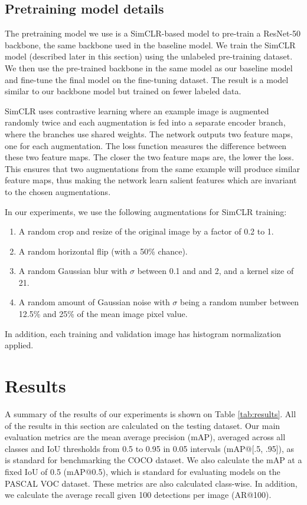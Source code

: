 \documentclass[conference]{IEEEtran}
\begin{document}
\subsection{Pretraining model details}

The pretraining model we use is a SimCLR-based model \cite{chenSimpleFrameworkContrastive2020} to pre-train a ResNet-50 backbone, the same backbone used in the baseline model. We train the SimCLR model (described later in this section) using the unlabeled pre-training dataset. We then use the pre-trained backbone in the same model as our baseline model and fine-tune the final model on the fine-tuning dataset. The result is a model similar to our backbone model but trained on fewer labeled data.

SimCLR uses contrastive learning where an example image is augmented randomly twice and each augmentation is fed into a separate encoder branch, where the branches use shared weights. The network outputs two feature maps, one for each augmentation. The loss function measures the difference between these two feature maps. The closer the two feature maps are, the lower the loss. This ensures that two augmentations from the same example will produce similar feature maps, thus making the network learn salient features which are invariant to the chosen augmentations.

In our experiments, we use the following augmentations for SimCLR training:

\begin{enumerate}
\item A random crop and resize of the original image by a factor of 0.2 to 1.
\item A random horizontal flip (with a 50\% chance).
\item A random Gaussian blur with $\sigma$ between 0.1 and and 2, and a kernel size of 21.
\item A random amount of Gaussian noise with $\sigma$ being a random number between 12.5\% and 25\% of the mean image pixel value.
\end{enumerate}

In addition, each training and validation image has histogram normalization applied.

\section{Results}\label{sec2}

A summary of the results of our experiments is shown on Table \ref{tab:results}. All of the results in this section are calculated on the testing dataset. Our main evaluation metrics are the mean average precision (mAP), averaged across all classes and IoU thresholds from 0.5 to 0.95 in 0.05 intervals (mAP@[.5, .95]), as is standard for benchmarking the COCO dataset. We also calculate the mAP at a fixed IoU of 0.5 (mAP@0.5), which is standard for evaluating models on the PASCAL VOC dataset. These metrics are also calculated class-wise. In addition, we calculate the average recall given 100 detections per image (AR@100).
\end{document}

